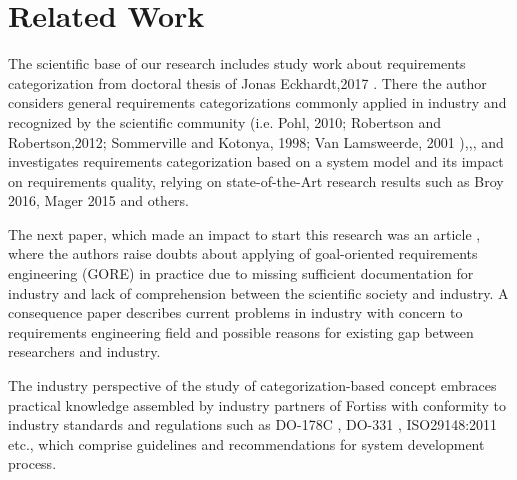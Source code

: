 
\section{Related Work}

The scientific base of our research includes study work about requirements categorization from doctoral thesis of Jonas Eckhardt,2017 \cite{3Eckhardt}. There the author considers general requirements categorizations commonly applied in industry and recognized by the scientific community (i.e. Pohl, 2010; Robertson and Robertson,2012; Sommerville and Kotonya, 1998; Van Lamsweerde, 2001 )\cite{2Pohl},\cite{4Robertson},\cite{5Sommerville},\cite{6Lamsweerde} and investigates requirements categorization based on a system model and its impact on requirements quality, relying on state-of-the-Art research results such as Broy 2016\cite{10Broy}, Mager 2015 \cite{11Mager} and others. 

The next paper, which made an impact to start this research was an article \cite{15Goals}, where the authors raise doubts about applying of goal-oriented requirements engineering (GORE) in practice due to missing sufficient documentation for industry and lack of comprehension between the scientific society and industry. A consequence paper \cite{16NaPiRe} describes current problems in industry with concern to requirements engineering field and possible reasons for existing gap between researchers and industry.

The industry perspective of the study of categorization-based concept embraces practical knowledge assembled by industry partners of Fortiss with conformity to industry standards and regulations such as DO-178C \cite{7DO-178C}, DO-331 \cite{8DO-331}, ISO29148:2011 \cite{9ISO29148} etc., which comprise guidelines and recommendations for system development process.

